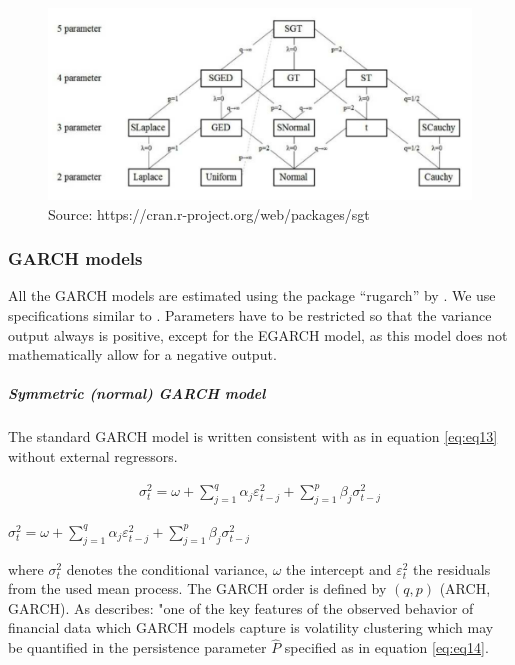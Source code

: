 \documentclass[a4paper, twoside]{templates/ociamthesis}
\begin{document}
\begin{figure}

{\centering \includegraphics[width=1\linewidth]{front-and-back-matter/images/SGT} 

}

\caption{Source: https://cran.r-project.org/web/packages/sgt}\label{fig:figure}
\end{figure}

\hypertarget{garch-models}{%
\subsubsection{GARCH models}\label{garch-models}}

All the GARCH models are estimated using the package ``rugarch'' by \textcite{alexios2020}. We use specifications similar to \textcite{ghalanos2020}. Parameters have to be restricted so that the variance output always is positive, except for the EGARCH model, as this model does not mathematically allow for a negative output.

\hypertarget{symmetric-normal-garch-model}{%
\subparagraph{Symmetric (normal) GARCH model}\label{symmetric-normal-garch-model}}

\noindent The standard GARCH model \autocite{bollerslev1986} is written consistent with \textcite{ghalanos2020} as in equation \eqref{eq:eq13} without external regressors.

\begin{align}
\sigma_t^2 = \omega  + \sum\limits_{j = 1}^q {{\alpha_j}\varepsilon _{t-j}^2 +} \sum\limits_{j=1}^p {{\beta_j}\sigma_{t-j}^2} 
 \label{eq:eq13}
\end{align}

\(\sigma_t^2 = \omega + \sum\limits_{j = 1}^q {{\alpha_j}\varepsilon _{t-j}^2 +} \sum\limits_{j=1}^p {{\beta_j}\sigma_{t-j}^2}\)

\noindent where \(\sigma_t^2\) denotes the conditional variance, \(\omega\) the intercept and \(\varepsilon_t^2\) the residuals from the used mean process. The GARCH order is defined by \((q, p)\) (ARCH, GARCH). As \textcite{ghalanos2020} describes: "one of the key features of the observed behavior of financial data which GARCH models capture is volatility clustering which may be quantified in the persistence parameter \(\hat{P}\) specified as in equation \eqref{eq:eq14}.
\end{document}
